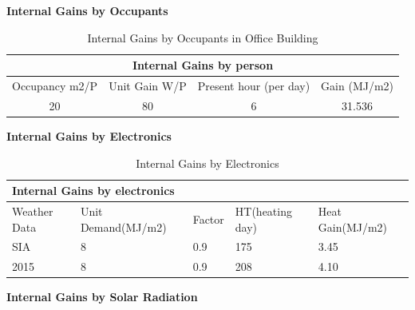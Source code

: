 \documentclass[11pt, a4paper]{article}
\theoremstyle{definition}
\begin{document}
		\textbf{Internal Gains by Occupants}\\ 
\begin{table}[H]
  \centering
\caption{Internal Gains by Occupants in Office Building}
    \begin{tabular}{cccc}
    \toprule
    \multicolumn{4}{c}{Internal Gains by person} \\
    \midrule
    \multicolumn{1}{c}{Occupancy m2/P} & \multicolumn{1}{c}{Unit Gain W/P} & \multicolumn{1}{c}{Present hour (per day)} & \multicolumn{1}{c}{Gain (MJ/m2)} \\
    \midrule
    20   & 80   & 6    & 31.536 \\
    \bottomrule
    \end{tabular}%
  \label{tab:SumatraPersonGain}%
\end{table}%


		\textbf{Internal Gains by Electronics}\\
		\begin{table}[H]
		\centering
		\caption{Internal Gains by Electronics}
		    \begin{tabular}{lllll}
		    \toprule
		    \multicolumn{5}{p{30.135em}}{Internal Gains by electronics} \\
		    \midrule
		    \multicolumn{1}{p{5.215em}}{Weather Data} & \multicolumn{1}{p{6.355em}}{Unit Demand\newline{}(MJ/m2)} & \multicolumn{1}{p{5.855em}}{Factor} & \multicolumn{1}{p{6.355em}}{HT\newline{}(heating day)} & \multicolumn{1}{p{6.355em}}{Heat Gain\newline{}(MJ/m2)} \\
		    \midrule
		    \multicolumn{1}{p{5.215em}}{SIA} & 8    & 0.9  & 175  & 3.45 \\
		    2015 & 8    & 0.9  & 208  & 4.10 \\
		    \bottomrule
		    \end{tabular}%
		  \label{tab:SumatraElecGains}%
		\end{table}%



		\textbf{Internal Gains by Solar Radiation}\\
\end{document}
